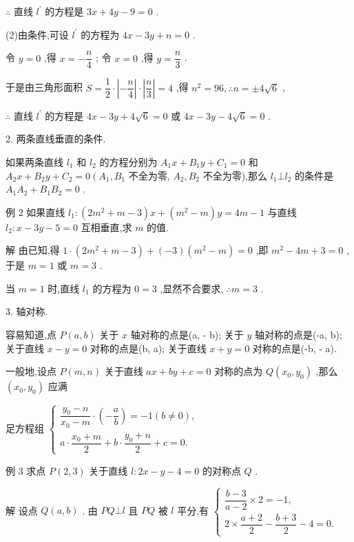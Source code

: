 $\therefore$ 直线 ${l}^{\prime }$ 的方程是 ${3x} + {4y} - 9 = 0$ .

(2)由条件,可设 ${l}^{\prime }$ 的方程为 ${4x} - {3y} + n = 0$ .

令 $y = 0$ ,得 $x =  - \dfrac{n}{4}$ ; 令 $x = 0$ ,得 $y = \dfrac{n}{3}$ .

于是由三角形面积 $S = \dfrac{1}{2} \cdot  \left| {-\dfrac{n}{4}}\right|  \cdot  \left| \dfrac{n}{3}\right|  = 4$ ,得 ${n}^{2} = {96},\therefore n =  \pm  4\sqrt{6}$ ,

$\therefore$ 直线 ${l}^{\prime }$ 的方程是 ${4x} - {3y} + 4\sqrt{6} = 0$ 或 ${4x} - {3y} - 4\sqrt{6} = 0$ .

2. 两条直线垂直的条件.

如果两条直线 ${l}_{1}$ 和 ${l}_{2}$ 的方程分别为 ${A}_{1}x + {B}_{1}y + {C}_{1} = 0$ 和 ${A}_{2}x + {B}_{2}y + {C}_{2} = 0\left( {{A}_{1},{B}_{1}}\right.$ 不全为零, ${A}_{2},{B}_{2}$ 不全为零),那么 ${l}_{1} \bot  {l}_{2}$ 的条件是 ${A}_{1}{A}_{2} + {B}_{1}{B}_{2} = 0$ .

例 2 如果直线 ${l}_{1} : \left( {2{m}^{2} + m - 3}\right) x + \left( {{m}^{2} - m}\right) y = {4m} - 1$ 与直线 ${l}_{2} : x - {3y} - 5 = 0$ 互相垂直,求 $m$ 的值.

解 由已知,得 $1 \cdot  \left( {2{m}^{2} + m - 3}\right)  + \left( {-3}\right) \left( {{m}^{2} - m}\right)  = 0$ ,即 ${m}^{2} - {4m} + 3 = 0$ ,于是 $m = 1$ 或 $m = 3$ .

当 $m = 1$ 时,直线 ${l}_{1}$ 的方程为 $0 = 3$ ,显然不合要求, $\therefore m = 3$ .

3. 轴对称.

容易知道,点 $P\left( {a,b}\right)$ 关于 $x$ 轴对称的点是(a, - b); 关于 $y$ 轴对称的点是(-a, b); 关于直线 $x - y = 0$ 对称的点是(b, a); 关于直线 $x + y = 0$ 对称的点是(-b, - a).

一般地,设点 $P\left( {m,n}\right)$ 关于直线 ${ax} + {by} + c = 0$ 对称的点为 $Q\left( {{x}_{0},{y}_{0}}\right)$ ,那么 $\left( {{x}_{0},{y}_{0}}\right)$ 应满

足方程组 $\left\{  \begin{array}{l} \dfrac{{y}_{0} - n}{{x}_{0} - m} \cdot  \left( {-\dfrac{a}{b}}\right)  =  - 1\left( {b \neq  0}\right) , \\  a \cdot  \dfrac{{x}_{0} + m}{2} + b \cdot  \dfrac{{y}_{0} + n}{2} + c = 0. \end{array}\right.$

例 3 求点 $P\left( {2,3}\right)$ 关于直线 $l : {2x} - y - 4 = 0$ 的对称点 $Q$ .

解 设点 $Q\left( {a,b}\right)$ . 由 ${PQ}\bot l$ 且 ${PQ}$ 被 $l$ 平分,有 $\left\{  \begin{array}{l} \dfrac{b - 3}{a - 2} \times  2 =  - 1, \\  2 \times  \dfrac{a + 2}{2} - \dfrac{b + 3}{2} - 4 = 0. \end{array}\right.$

